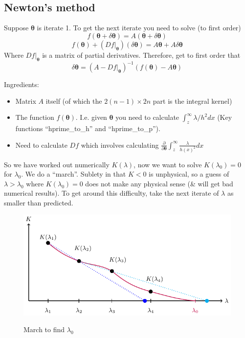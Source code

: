 \documentclass{article}
\newcommand{\bs}{\boldsymbol}                               %
\begin{document}
\subsection*{Newton's method}
Suppose $\bs{\theta}$ is iterate 1. To get the next iterate you need to solve (to 
first order)
\[ f(\bs{\theta}+\delta\bs{\theta}) = A(\bs{\theta}+\delta \bs{\theta})\]
\[ f(\bs{\theta}) + (Df|_{\bs{\theta}})(\delta\bs{\theta}) = A\bs{\theta}+A\delta \bs{\theta}\]
Where $Df|_{\bs{\theta}}$ is a matrix of partial derivatives. Therefore, get to 
first order that 
\[ \delta \bs{\theta} =  (A-Df|_{\bs{\theta}})^{-1}(f(\bs{\theta}) - A\bs{\theta}) \]

Ingredients:
\begin{itemize}
\item Matrix $A$ itself (of which the $2(n-1)\times2n$ part is the integral
      kernel)
\item The function $f(\bs{\theta})$. I.e. given $\bs{\theta}$ you need to calculate
      $\int_z^{\infty}\lambda/h^2 dx$ (Key functions ``hprime\_to\_h'' and
      ``hprime\_to\_p'').
\item Need to calculate $Df$ which involves calculating $\displaystyle \frac
      {\partial} {\partial \bs{\theta}} \int_z^{\infty} \frac{\lambda}{h(x)^2}dx$

\end{itemize}
So we have worked out numerically $K(\lambda)$, now we want to solve 
$K(\lambda_0)=0$ for $\lambda_0$. We do a ``march''. Sublety in that $K<0$ is 
unphysical, so a guess of $\lambda>\lambda_0$ where $K(\lambda_0)=0$ does
not make any physical sense (\& will get bad numerical results). To get 
around this difficulty, take the next iterate of $\lambda$ as smaller than
predicted.
\begin{figure}[!ht]\centering
\caption{March to find $\lambda_0$}
\includegraphics{NumFig1.pdf}\label{March}
\end{figure}
\end{document}
